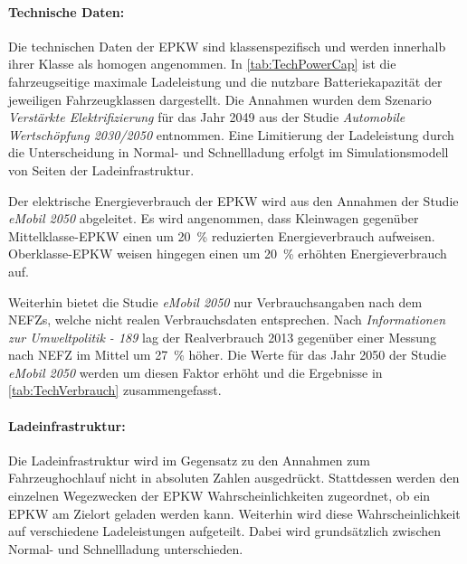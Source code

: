 \paragraph{Technische Daten:}

Die technischen Daten der \gls{EPKW} sind klassenspezifisch und werden innerhalb ihrer Klasse als homogen angenommen.
In \autoref{tab:TechPowerCap} ist die fahrzeugseitige maximale Ladeleistung und die nutzbare Batteriekapazität der jeweiligen Fahrzeugklassen dargestellt.
Die Annahmen wurden dem Szenario \textit{Verstärkte Elektrifizierung} für das Jahr \num{2049} aus der Studie \textit{Automobile Wertschöpfung 2030/2050} \cite{Kaul2019} entnommen.
Eine Limitierung der Ladeleistung durch die Unterscheidung in Normal- und Schnellladung erfolgt im Simulationsmodell von Seiten der Ladeinfrastruktur.



Der elektrische Energieverbrauch der \gls{EPKW} wird aus den Annahmen der Studie \textit{eMobil 2050} \cite{Hacker2014} abgeleitet.
Es wird angenommen, dass Kleinwagen gegenüber Mittelklasse-\gls{EPKW} einen um \SI{20}{\percent} reduzierten Energieverbrauch aufweisen.
Oberklasse-\gls{EPKW} weisen hingegen einen um \SI{20}{\percent} erhöhten Energieverbrauch auf.

Weiterhin bietet die Studie \textit{eMobil 2050} nur Verbrauchsangaben nach dem \glspl{NEFZ}, welche nicht realen Verbrauchsdaten entsprechen.
Nach \textit{Informationen zur Umweltpolitik - 189} \cite{Heinfellner2015} lag der Realverbrauch \num{2013} gegenüber einer Messung nach \gls{NEFZ} im Mittel um \SI{27}{\percent} höher.
Die Werte für das Jahr \num{2050} der Studie \textit{eMobil 2050} werden um diesen Faktor erhöht und die Ergebnisse in \autoref{tab:TechVerbrauch} zusammengefasst.




\paragraph{Ladeinfrastruktur:}

Die Ladeinfrastruktur wird im Gegensatz zu den Annahmen zum Fahrzeughochlauf nicht in absoluten Zahlen ausgedrückt.
Stattdessen werden den einzelnen Wegezwecken der \gls{EPKW} Wahrscheinlichkeiten zugeordnet, ob ein \gls{EPKW} am Zielort geladen werden kann.
Weiterhin wird diese Wahrscheinlichkeit auf verschiedene Ladeleistungen aufgeteilt.
Dabei wird grundsätzlich zwischen Normal- und Schnellladung unterschieden.


